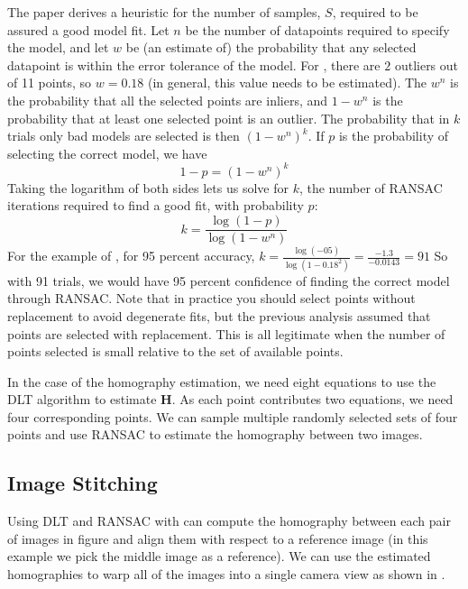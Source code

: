 The paper \cite{Fischler1981} derives a heuristic for the number of samples, $S$, required to be assured a good model fit.  Let $n$ be the number of datapoints required to specify the model, and let $w$ be (an estimate of) the probability that any selected datapoint is within the error tolerance of the model.   For , there are $2$ outliers out of 11 points, so $w = 0.18$ (in general, this value needs to be estimated).  The $w^n$ is the probability that all the selected points are inliers, and $1 -  w^n$ is the probability that at least one selected point is an outlier.  The probability that in $k$ trials only bad models are selected is then $(1 -  w^n)^k$.  If $p$ is the probability of selecting the correct model, we have %
\begin{equation}
    1-p = (1 -  w^n)^k
\end{equation}
Taking the logarithm of both sides lets us solve for $k$, the number of RANSAC iterations required to find a good fit, with probability $p$:
\begin{equation}
    k = \frac{\log(1-p)}{\log(1-w^n)}
    \label{eq:k}
\end{equation}
For the example of \fig{\ref{fig:ransac}}, for 95 percent accuracy, $k = \frac{\log(-05)}{\log(1-0.18^2)} = \frac{-1.3}{-0.0143} = 91$
So with 91 trials, we would have 95 percent confidence of finding the correct model through RANSAC. Note that in practice you should select points without replacement to avoid degenerate fits, but the previous analysis assumed that points are selected with replacement.  This is all legitimate when the number of points selected is small relative to the set of available points.

In the case of the homography estimation, we need eight equations to use the DLT algorithm to estimate $\mathbf{H}$. As each point contributes two equations, we need four corresponding points. We can sample multiple randomly selected sets of four points and use RANSAC to estimate the homography between two images.

\subsection{Image Stitching}

Using DLT and RANSAC with can compute the homography between each pair of images in figure and align them with respect to a reference image (in this example we pick the middle image as a reference). We can use the estimated homographies to warp all of the images into a single camera view as shown in \fig{\ref{fig:panorama}}.

